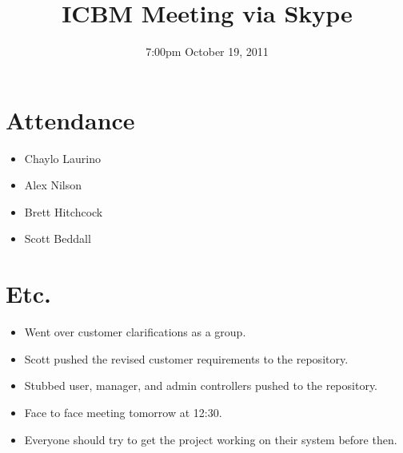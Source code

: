 \documentclass{article}
\begin{document}
\title{ICBM Meeting via Skype}
\date{7:00pm October 19, 2011}
\maketitle

\section{Attendance}
\begin{itemize}
\item Chaylo Laurino
\item Alex Nilson
\item Brett Hitchcock
\item Scott Beddall
\end{itemize}

\section{Etc.}
\begin{itemize}
\item Went over customer clarifications as a group.
\item Scott pushed the revised customer requirements to the repository.
\item Stubbed user, manager, and admin controllers pushed to the repository.
\item Face to face meeting tomorrow at 12:30.
\item Everyone should try to get the project working on their system before then.
\end{itemize}
 
\end{document}
